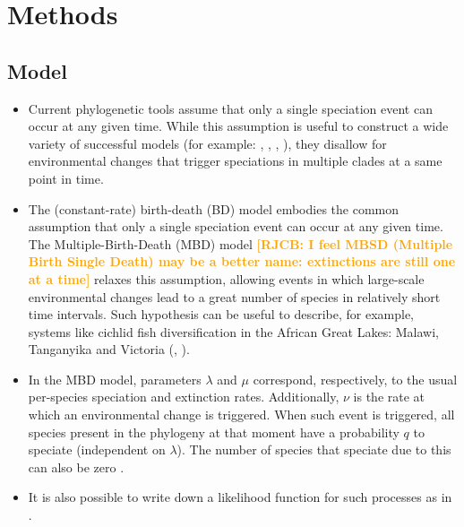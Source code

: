 \documentclass{article}
\newcommand*\richel[1]{\textcolor{orange}{\textbf{[RJCB: #1]}}}
\begin{document}
\section{Methods}

\subsection{Model}
\begin{itemize}

\item Current phylogenetic tools assume that only a single speciation event can occur at any given time.
While this assumption is useful to construct a wide variety of successful 
models (for example: \cite{Maddison2007biSSE}, \cite{Valente2015}, \cite{etienne2012diversity}, \cite{etienne2014estimating}),
they disallow for environmental changes that trigger speciations in multiple clades at a same point in time.

\item The (constant-rate) birth-death (BD) model embodies the common assumption that 
only a single speciation event can occur at any given time.
The Multiple-Birth-Death (MBD) model \richel{I feel MBSD (Multiple Birth Single Death) may be a better name: extinctions are still one at a time} relaxes this assumption, allowing events in which 
large-scale environmental changes lead to a great number of species 
in relatively short time intervals. Such hypothesis can be useful to describe, for example, 
systems like cichlid fish diversification in the 
African Great Lakes: Malawi, Tanganyika and Victoria (\cite{janzen2016}, \cite{janzen2017}).

\item In the MBD model, parameters $\lambda$ and $\mu$ correspond, respectively, 
to the usual per-species speciation and extinction rates. 
Additionally, $\nu$ is the rate at which an environmental change is triggered.
When such event is triggered, all species present in the phylogeny at that moment
have a probability $q$ to speciate (independent on $\lambda$).
The number of species that speciate due to this can also be zero . 

\item It is also possible to write down a likelihood function for such processes as in \cite{mbd}.
    
\end{itemize}
\end{document}

